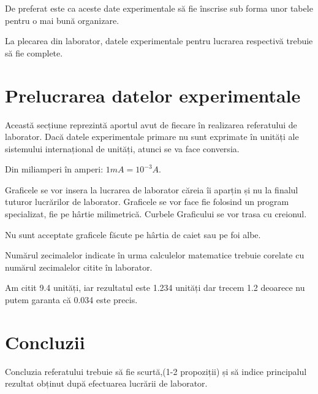 \documentclass[12pt]{article}
\begin{document}
\begin{tcolorbox}[colback=yellow!10!white, colframe=black, title=Observație]
De preferat este ca aceste date experimentale să fie înscrise sub forma unor tabele pentru o mai bună organizare.
\end{tcolorbox}

\begin{tcolorbox}[colback=yellow!10!white, colframe=black, title=Observație]
La plecarea din laborator, datele experimentale pentru lucrarea respectivă trebuie să fie complete.
\end{tcolorbox}

\section{Prelucrarea datelor experimentale}
Această secțiune reprezintă aportul avut de fiecare în realizarea referatului de laborator. Dacă datele experimentale primare nu sunt exprimate
în unități ale sistemului internațional de unități, atunci se va face conversia.

\begin{tcolorbox}[colback=yellow!10!white, colframe=black, title=Exemplu]
Din miliamperi în amperi: $1 mA = 10^{-3} A$.
\end{tcolorbox}

Graficele se vor insera la lucrarea de laborator căreia îi aparțin și nu la finalul tuturor lucrărilor de laborator. Graficele se vor face fie folosind
un program specializat, fie pe hârtie milimetrică. Curbele Graficului se vor trasa cu creionul.

\begin{tcolorbox}[colback=yellow!10!white, colframe=black, title=Observație]
Nu sunt acceptate graficele făcute pe hârtia de caiet sau pe foi albe.
\end{tcolorbox}

Numărul zecimalelor indicate în urma calculelor matematice trebuie corelate cu numărul zecimalelor citite în laborator.

\begin{tcolorbox}[colback=yellow!10!white, colframe=black, title=Exemplu]
Am citit 9.4 unități, iar rezultatul este 1.234 unități dar trecem 1.2 deoarece nu putem garanta că 0.034 este precis.
\end{tcolorbox}

\section{Concluzii}
Concluzia referatului trebuie să fie scurtă,(1-2 propoziții) și să indice principalul rezultat obținut după efectuarea lucrării de laborator.
\end{document}
